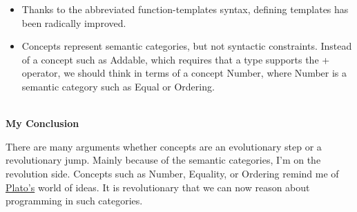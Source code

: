 \begin{tcolorbox}[breakable,enhanced jigsaw,colback=blue!5!white,colframe=blue!75!black,title=Regular Types]
\begin{itemize}
\item 
Thanks to the abbreviated function-templates syntax, defining templates has been radically improved.

\item 
Concepts represent semantic categories, but not syntactic constraints. Instead of a concept such as Addable, which requires that a type supports the + operator, we should think in terms of a concept Number, where Number is a semantic category such as Equal or Ordering.
\end{itemize}

\hspace*{\fill} \\ %
\noindent
\textbf{My Conclusion}

There are many arguments whether concepts are an evolutionary step or a revolutionary jump. Mainly because of the semantic categories, I’m on the revolution side. Concepts such as Number, Equality, or Ordering remind me of \href{https://en.wikipedia.org/wiki/Plato}{Plato’s} world of ideas. It is revolutionary that we can now reason about programming in such categories.
\end{tcolorbox}

